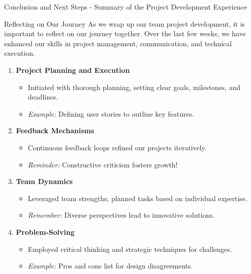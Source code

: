\documentclass[aspectratio=169]{beamer}
\begin{document}
\begin{frame}[fragile]{Conclusion and Next Steps - Summary of the Project Development Experience}
  \begin{block}{Reflecting on Our Journey}
    As we wrap up our team project development, it is important to reflect on our journey together. Over the last few weeks, we have enhanced our skills in project management, communication, and technical execution.
  \end{block}

  \begin{enumerate}
    \item \textbf{Project Planning and Execution}
    \begin{itemize}
      \item Initiated with thorough planning, setting clear goals, milestones, and deadlines.
      \item \emph{Example:} Defining user stories to outline key features.
    \end{itemize}

    \item \textbf{Feedback Mechanisms}
    \begin{itemize}
      \item Continuous feedback loops refined our projects iteratively.
      \item \emph{Reminder:} Constructive criticism fosters growth!
    \end{itemize}

    \item \textbf{Team Dynamics}
    \begin{itemize}
      \item Leveraged team strengths; planned tasks based on individual expertise.
      \item \emph{Remember:} Diverse perspectives lead to innovative solutions.
    \end{itemize}
    
    \item \textbf{Problem-Solving}
    \begin{itemize}
      \item Employed critical thinking and strategic techniques for challenges.
      \item \emph{Example:} Pros and cons list for design disagreements.
    \end{itemize}
  \end{enumerate}
\end{frame}
\end{document}
